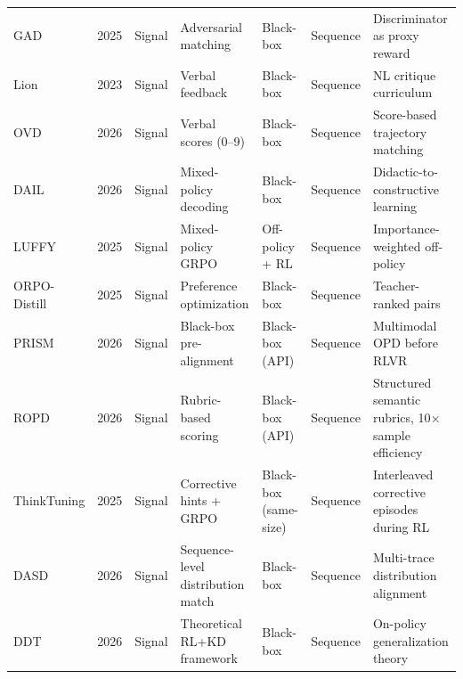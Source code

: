 \documentclass{article} %
\begin{document}
\begin{table}[t]
{\begin{tabular}{@{}lclllll@{}}
        \midrule
        GAD \citep{2511.10643} & 2025 & Signal & Adversarial matching & Black-box & Sequence & Discriminator as proxy reward \\
        Lion \citep{2305.12870} & 2023 & Signal & Verbal feedback & Black-box & Sequence & NL critique curriculum \\
        OVD \citep{2601.21968} & 2026 & Signal & Verbal scores (0--9) & Black-box & Sequence & Score-based trajectory matching \\
        DAIL \citep{2602.02405} & 2026 & Signal & Mixed-policy decoding & Black-box & Sequence & Didactic-to-constructive learning \\
        LUFFY \citep{2504.14945} & 2025 & Signal & Mixed-policy GRPO & Off-policy + RL & Sequence & Importance-weighted off-policy \\
        ORPO-Distill \citep{2509.25100} & 2025 & Signal & Preference optimization & Black-box & Sequence & Teacher-ranked pairs \\
        PRISM \citep{wang2026prism} & 2026 & Signal & Black-box pre-alignment & Black-box (API) & Sequence & Multimodal OPD before RLVR \\
        ROPD \citep{fang2026ropd} & 2026 & Signal & Rubric-based scoring & Black-box (API) & Sequence & Structured semantic rubrics, 10$\times$ sample efficiency \\
        ThinkTuning \citep{rrv2025thinktuning} & 2025 & Signal & Corrective hints + GRPO & Black-box (same-size) & Sequence & Interleaved corrective episodes during RL \\
        DASD \citep{2601.09088} & 2026 & Signal & Sequence-level distribution match & Black-box & Sequence & Multi-trace distribution alignment \\
        DDT \citep{2602.12222} & 2026 & Signal & Theoretical RL+KD framework & Black-box & Sequence & On-policy generalization theory \\
        \bottomrule
    \end{tabular}
    }
\end{table}
\end{document}
